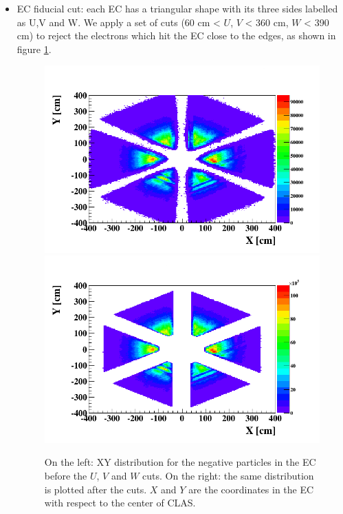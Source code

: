 \begin{itemize}
\begin{itemize}
\item EC fiducial cut: each EC has a triangular shape with its three sides labelled as U,V and W. We apply a set of cuts (60 cm < $U$, $V$ < 360 cm, $W$ < 390 cm) to reject the electrons which hit the EC close to the edges, as shown in figure \ref{fig:EC_cut}.
\begin{figure}[tbp]
\hspace{-0.2in}
\includegraphics[scale=0.35]{fig_analysis/EC_XY_el_1.png}
\includegraphics[scale=0.35]{fig_analysis/EC_XY_el_2.png}
\caption{On the left: XY distribution for the negative particles in the EC before the $U$, $V$ and $W$ cuts. On the right: the same distribution is plotted after the cuts. $X$ and $Y$ are the coordinates in the EC with respect to the center of CLAS.} 
\label{fig:EC_cut}
\end{figure}


\end{itemize}
\end{itemize}

